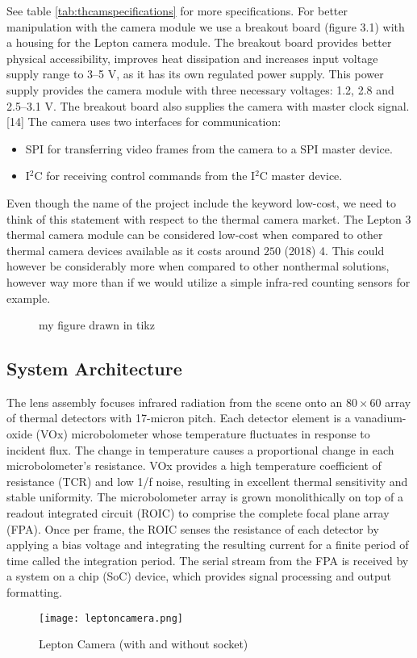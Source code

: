 See table \ref{tab:thcamspecifications} for more specifications. For better
manipulation with the camera module we use a breakout board (figure 3.1) with a
housing for the Lepton camera module. The breakout board provides better
physical accessibility, improves heat dissipation and increases input voltage
supply range to 3--5 \si{\volt}, as it has its own regulated power supply. This
power supply provides the camera module with three necessary voltages: 1.2, 2.8
and 2.5--3.1 \si{\volt}. The breakout board also supplies the camera with master
clock signal. [14] The camera uses two interfaces for communication:
\begin{itemize}
    \item SPI for transferring video frames from the camera to a SPI master
device.
    \item I$^{2}$C for receiving control commands from the I$^{2}$C master
device.
\end{itemize}
Even though the name of the project include the keyword low-cost, we need to
think of this statement with respect to the thermal camera market. The Lepton 3
thermal camera module can be considered low-cost when compared to other thermal
camera devices available as it costs around $250$ (2018) 4. This could however
be considerably more when compared to other nonthermal solutions, however way
more than if we would utilize a simple infra-red counting sensors for example.
%
\begin{figure}[htb]
    \centering
    \resizebox{0.8\textwidth}{!}{}
    \caption{my figure drawn in tikz}\label{fig:myfigure}
\end{figure}
%
\subsection{System Architecture}
\label{ssec:leptonarchitecture}
The lens assembly focuses infrared radiation from the scene onto an $80 \times 60$ array
of thermal detectors with 17-micron pitch. Each detector element is a
vanadium-oxide (VOx) microbolometer whose temperature fluctuates in response to
incident flux. The change in temperature causes a proportional change in each
microbolometer’s resistance. VOx provides a high temperature coefficient of
resistance (TCR) and low 1/f noise, resulting in excellent thermal sensitivity
and stable uniformity. The microbolometer array is grown monolithically on top
of a readout integrated circuit (ROIC) to comprise the complete focal plane
array (FPA). Once per frame, the ROIC senses the resistance of each detector by
applying a bias voltage and integrating the resulting current for a finite
period of time called the integration period. The serial stream from the FPA is
received by a system on a chip (SoC) device, which provides signal processing
and output formatting.
%
\begin{figure}[htb]
    \centering
    \texttt{[image: leptoncamera.png]}
    \caption{Lepton Camera (with and without socket)}
    \label{fig:camerarender}
\end{figure}
%
